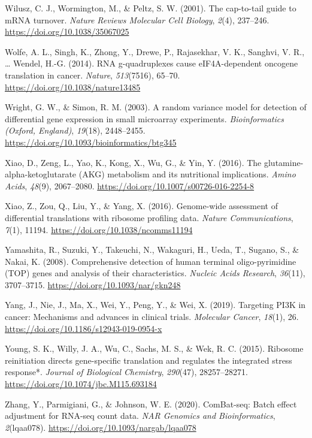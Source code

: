 \documentclass[12pt,openany]{book}
\begin{document}
\hypertarget{ref-Wilusz2001}{}
Wilusz, C. J., Wormington, M., \& Peltz, S. W. (2001). The cap-to-tail
guide to mRNA turnover. \emph{Nature Reviews Molecular Cell Biology},
\emph{2}(4), 237--246. \url{https://doi.org/10.1038/35067025}

\hypertarget{ref-Wolfe2014}{}
Wolfe, A. L., Singh, K., Zhong, Y., Drewe, P., Rajasekhar, V. K.,
Sanghvi, V. R., \ldots{} Wendel, H.-G. (2014). RNA g-quadruplexes cause
eIF4A-dependent oncogene translation in cancer. \emph{Nature},
\emph{513}(7516), 65--70. \url{https://doi.org/10.1038/nature13485}

\hypertarget{ref-Wright2003}{}
Wright, G. W., \& Simon, R. M. (2003). A random variance model for
detection of differential gene expression in small microarray
experiments. \emph{Bioinformatics (Oxford, England)}, \emph{19}(18),
2448--2455. \url{https://doi.org/10.1093/bioinformatics/btg345}

\hypertarget{ref-Xiao2016a}{}
Xiao, D., Zeng, L., Yao, K., Kong, X., Wu, G., \& Yin, Y. (2016). The
glutamine-alpha-ketoglutarate (AKG) metabolism and its nutritional
implications. \emph{Amino Acids}, \emph{48}(9), 2067--2080.
\url{https://doi.org/10.1007/s00726-016-2254-8}

\hypertarget{ref-Xiao2016}{}
Xiao, Z., Zou, Q., Liu, Y., \& Yang, X. (2016). Genome-wide assessment
of differential translations with ribosome profiling data. \emph{Nature
Communications}, \emph{7}(1), 11194.
\url{https://doi.org/10.1038/ncomms11194}

\hypertarget{ref-Yamashita2008}{}
Yamashita, R., Suzuki, Y., Takeuchi, N., Wakaguri, H., Ueda, T., Sugano,
S., \& Nakai, K. (2008). Comprehensive detection of human terminal
oligo-pyrimidine (TOP) genes and analysis of their characteristics.
\emph{Nucleic Acids Research}, \emph{36}(11), 3707--3715.
\url{https://doi.org/10.1093/nar/gkn248}

\hypertarget{ref-Yang2019}{}
Yang, J., Nie, J., Ma, X., Wei, Y., Peng, Y., \& Wei, X. (2019).
Targeting PI3K in cancer: Mechanisms and advances in clinical trials.
\emph{Molecular Cancer}, \emph{18}(1), 26.
\url{https://doi.org/10.1186/s12943-019-0954-x}

\hypertarget{ref-Young2015}{}
Young, S. K., Willy, J. A., Wu, C., Sachs, M. S., \& Wek, R. C. (2015).
Ribosome reinitiation directs gene-specific translation and regulates
the integrated stress response*. \emph{Journal of Biological Chemistry},
\emph{290}(47), 28257--28271.
\url{https://doi.org/10.1074/jbc.M115.693184}

\hypertarget{ref-Zhang2020}{}
Zhang, Y., Parmigiani, G., \& Johnson, W. E. (2020). ComBat-seq: Batch
effect adjustment for RNA-seq count data. \emph{NAR Genomics and
Bioinformatics}, \emph{2}(lqaa078).
\url{https://doi.org/10.1093/nargab/lqaa078}
\end{document}
